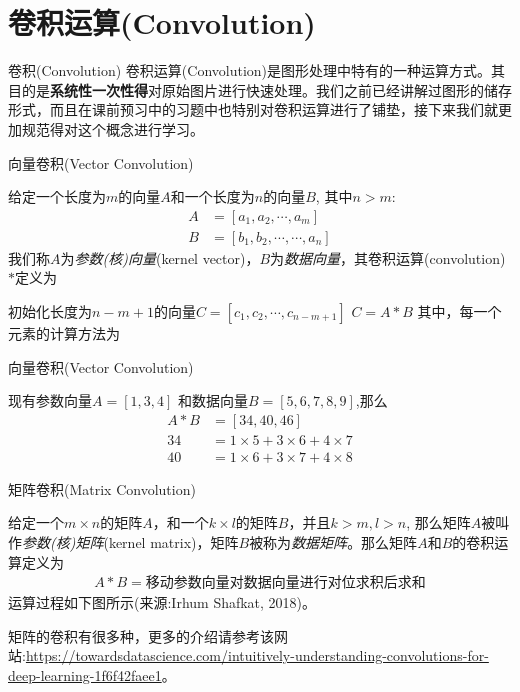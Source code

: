 \documentclass[handout]{beamer}
\begin{document}
\section{卷积运算(Convolution)}


\begin{frame}{卷积(Convolution)}
卷积运算(Convolution)是图形处理中特有的一种运算方式。其目的是\textbf{系统性一次性得}对原始图片进行快速处理。我们之前已经讲解过图形的储存形式，而且在课前预习中的习题中也特别对卷积运算进行了铺垫，接下来我们就更加规范得对这个概念进行学习。
\end{frame}


\begin{frame}{向量卷积(Vector Convolution)}
\begin{definition}
{\footnotesize
	给定一个长度为$m$的向量$A$和一个长度为$n$的向量$B$, 其中$n > m$:
	\begin{align*}
		A & = [a_1, a_2, \cdots, a_m ] \\
		B & = [b_1, b_2, \cdots, \cdots, a_n]
	\end{align*}
	我们称$A$为\textit{参数(核)向量}(kernel vector)，$B$为\textit{数据向量}，其卷积运算(convolution)$*$定义为
\begin{algorithm}[H]
	\SetAlgoLined
	\caption{Convolution Operation}
	初始化长度为$n-m+1$的向量$C = [c_1, c_2, \cdots, c_{n-m+1}]$ \;
	$C = A * B $ \; 其中，每一个元素的计算方法为\;
	\end{algorithm}
}
\end{definition}
\end{frame}

\begin{frame}{向量卷积(Vector Convolution)}
\begin{example}
	现有参数向量$A=[1, 3, 4]$ 和数据向量$B = [5, 6, 7 , 8 , 9]$,那么
	\begin{align*}
		A * B & = [34, 40, 46]\\
		34 & = 1\times 5 + 3 \times 6 + 4 \times 7 \\
		40 & = 1 \times 6 + 3 \times 7 + 4 \times 8 
	\end{align*}
\end{example}
\end{frame}


\begin{frame}{矩阵卷积(Matrix Convolution)}
\begin{definition}
	给定一个$m \times n$的矩阵$A$，和一个$k \times l$的矩阵$B$，并且$k > m, l > n$, 那么矩阵$A$被叫作\textit{参数(核)矩阵}(kernel matrix)，矩阵$B$被称为\textit{数据矩阵}。那么矩阵$A$和$B$的卷积运算定义为
	\begin{align*}
		A * B = \text{移动参数向量对数据向量进行对位求积后求和}
	\end{align*}
	运算过程如下图所示(来源:Irhum Shafkat, 2018)。
\end{definition}
矩阵的卷积有很多种，更多的介绍请参考该网站:\url{https://towardsdatascience.com/intuitively-understanding-convolutions-for-deep-learning-1f6f42faee1}。
\end{frame}
\end{document}
